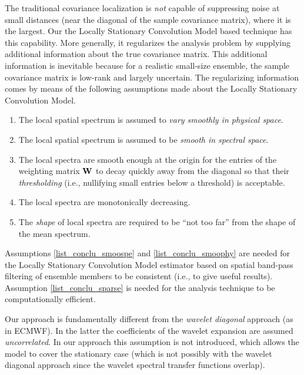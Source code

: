 \documentclass[12pt]{article}
\newcommand{\ie}{i.e., }
\begin{document}
The traditional covariance localization is {\em not} capable of suppressing 
noise at small distances (near the diagonal of the sample
covariance matrix), where it is the largest.
Our the Locally Stationary Convolution Model based technique has this capability.
More generally, it regularizes the analysis problem by supplying additional information about the
true covariance matrix. This additional information is inevitable because 
for a realistic small-size ensemble, the sample covariance matrix
is low-rank and  largely uncertain.
The regularizing information comes by means of the following assumptions made about the Locally Stationary Convolution Model.
%
\begin{enumerate}
\item
\label{list_conclu_smoospe}
The local spatial spectrum is assumed to {\em vary smoothly in physical space}.

\item
\label{list_conclu_smoophy}
The local spatial spectrum is assumed to be {\em smooth in spectral space}.

\item
\label{list_conclu_sparse}
The local spectra are smooth enough at the origin for the 
entries of the weighting matrix ${\bf W}$  to decay quickly away from the diagonal
so that their {\em thresholding} (\ie nullifying small entries below a threshold)
is acceptable.

\item
The local spectra are monotonically decreasing.

\item
The {\em shape} of local spectra are required to be ``not too far'' from the shape of the mean spectrum.

\end{enumerate}

Assumptions \ref{list_conclu_smoospe} and \ref{list_conclu_smoophy}
 are needed for the Locally Stationary Convolution Model estimator based on spatial band-pass filtering of ensemble members 
to be consistent (\ie to give useful results). 
Assumption \ref{list_conclu_sparse} is needed for the analysis technique
to be computationally efficient.


Our approach is fundamentally different from the {\em wavelet diagonal} approach (as in ECMWF).
In the latter the coefficients of the wavelet expansion are assumed {\em uncorrelated}.
In our approach this assumption is not introduced, which allows the model to cover
the stationary case (which is not possibly with the wavelet diagonal approach since the 
wavelet spectral transfer functions overlap).
\end{document}
